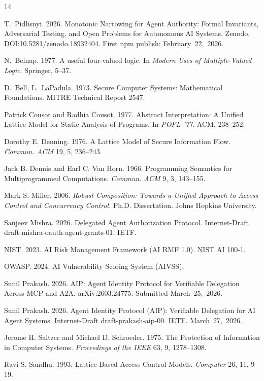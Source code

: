 \documentclass[sigconf,nonacm]{acmart}
\begin{document}

\begin{thebibliography}{14}

T.~Pidlisnyi. 2026. Monotonic Narrowing for Agent Authority: Formal Invariants,
Adversarial Testing, and Open Problems for Autonomous AI Systems.
Zenodo. DOI:10.5281/zenodo.18932404. First npm publish: February~22,~2026.

N.~Belnap. 1977. A useful four-valued logic.
In \emph{Modern Uses of Multiple-Valued Logic}. Springer, 5--37.

D.~Bell, L.~LaPadula. 1973. Secure Computer Systems: Mathematical Foundations.
MITRE Technical Report 2547.

Patrick Cousot and Radhia Cousot. 1977. Abstract Interpretation: A Unified Lattice
Model for Static Analysis of Programs. In \emph{POPL '77}. ACM, 238--252.

Dorothy E. Denning. 1976. A Lattice Model of Secure Information Flow. \emph{Commun. ACM}
19, 5, 236--243.

Jack B. Dennis and Earl C. Van Horn. 1966. Programming Semantics for Multiprogrammed
Computations. \emph{Commun. ACM} 9, 3, 143--155.

Mark S. Miller. 2006. \emph{Robust Composition: Towards a Unified Approach to Access
Control and Concurrency Control}. Ph.D. Dissertation. Johns Hopkins University.

Sanjeev Mishra. 2026. Delegated Agent Authorization Protocol.
Internet-Draft draft-mishra-oauth-agent-grants-01. IETF.

NIST. 2023. AI Risk Management Framework (AI RMF 1.0). NIST AI 100-1.

OWASP. 2024. AI Vulnerability Scoring System (AIVSS).

Sunil Prakash. 2026. AIP: Agent Identity Protocol for Verifiable Delegation Across
MCP and A2A. arXiv:2603.24775. Submitted March~25,~2026.

Sunil Prakash. 2026. Agent Identity Protocol (AIP): Verifiable Delegation for AI
Agent Systems. Internet-Draft draft-prakash-aip-00. IETF. March~27,~2026.

Jerome H. Saltzer and Michael D. Schroeder. 1975. The Protection of Information in
Computer Systems. \emph{Proceedings of the IEEE} 63, 9, 1278--1308.

Ravi S. Sandhu. 1993. Lattice-Based Access Control Models. \emph{Computer} 26, 11, 9--19.

\end{thebibliography}
\end{document}
